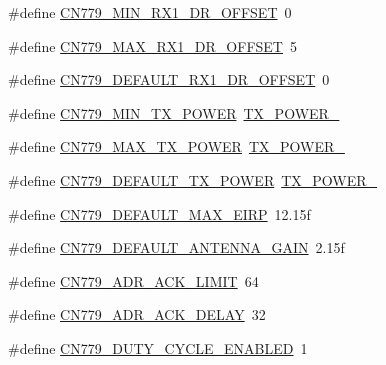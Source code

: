 \begin{DoxyCompactItemize}
\item 
\#define \mbox{\hyperlink{group___r_e_g_i_o_n_c_n779_gae0ef3405f8d33d4b21e74588b50c2569}{C\+N779\+\_\+\+M\+I\+N\+\_\+\+R\+X1\+\_\+\+D\+R\+\_\+\+O\+F\+F\+S\+ET}}~0
\item 
\#define \mbox{\hyperlink{group___r_e_g_i_o_n_c_n779_ga92a7cb914b3c213f1506f8dd927e6077}{C\+N779\+\_\+\+M\+A\+X\+\_\+\+R\+X1\+\_\+\+D\+R\+\_\+\+O\+F\+F\+S\+ET}}~5
\item 
\#define \mbox{\hyperlink{group___r_e_g_i_o_n_c_n779_ga8e88b35f91ebd807975b5712ccbfef2a}{C\+N779\+\_\+\+D\+E\+F\+A\+U\+L\+T\+\_\+\+R\+X1\+\_\+\+D\+R\+\_\+\+O\+F\+F\+S\+ET}}~0
\item 
\#define \mbox{\hyperlink{group___r_e_g_i_o_n_c_n779_gab0e266968cb85199e9002eb1d3c5a719}{C\+N779\+\_\+\+M\+I\+N\+\_\+\+T\+X\+\_\+\+P\+O\+W\+ER}}~\mbox{\hyperlink{group___r_e_g_i_o_n_ga0149d52581db80901b5bc1adf0aedd1d}{T\+X\+\_\+\+P\+O\+W\+E\+R\+\_}}
\item 
\#define \mbox{\hyperlink{group___r_e_g_i_o_n_c_n779_ga8a70356561f3416db21a1e93b4ee4ae9}{C\+N779\+\_\+\+M\+A\+X\+\_\+\+T\+X\+\_\+\+P\+O\+W\+ER}}~\mbox{\hyperlink{group___r_e_g_i_o_n_gab33618449f2a573142c463ab071ef8ed}{T\+X\+\_\+\+P\+O\+W\+E\+R\+\_}}
\item 
\#define \mbox{\hyperlink{group___r_e_g_i_o_n_c_n779_ga0a41ad46e00759176adb3ef4a8e937cb}{C\+N779\+\_\+\+D\+E\+F\+A\+U\+L\+T\+\_\+\+T\+X\+\_\+\+P\+O\+W\+ER}}~\mbox{\hyperlink{group___r_e_g_i_o_n_gab33618449f2a573142c463ab071ef8ed}{T\+X\+\_\+\+P\+O\+W\+E\+R\+\_}}
\item 
\#define \mbox{\hyperlink{group___r_e_g_i_o_n_c_n779_ga77bd9b50f37cb6182e330e7203aab158}{C\+N779\+\_\+\+D\+E\+F\+A\+U\+L\+T\+\_\+\+M\+A\+X\+\_\+\+E\+I\+RP}}~12.\+15f
\item 
\#define \mbox{\hyperlink{group___r_e_g_i_o_n_c_n779_ga055a39b4bc3aae2e812aab0a96561fee}{C\+N779\+\_\+\+D\+E\+F\+A\+U\+L\+T\+\_\+\+A\+N\+T\+E\+N\+N\+A\+\_\+\+G\+A\+IN}}~2.\+15f
\item 
\#define \mbox{\hyperlink{group___r_e_g_i_o_n_c_n779_ga8c19c4c4ef1a00d6865607b7d61f0325}{C\+N779\+\_\+\+A\+D\+R\+\_\+\+A\+C\+K\+\_\+\+L\+I\+M\+IT}}~64
\item 
\#define \mbox{\hyperlink{group___r_e_g_i_o_n_c_n779_ga56814f06a0fa6b826baad368920004a4}{C\+N779\+\_\+\+A\+D\+R\+\_\+\+A\+C\+K\+\_\+\+D\+E\+L\+AY}}~32
\item 
\#define \mbox{\hyperlink{group___r_e_g_i_o_n_c_n779_ga87494ed194c1c38e301dbb4990f7f005}{C\+N779\+\_\+\+D\+U\+T\+Y\+\_\+\+C\+Y\+C\+L\+E\+\_\+\+E\+N\+A\+B\+L\+ED}}~1
\item 

\end{DoxyCompactItemize}

